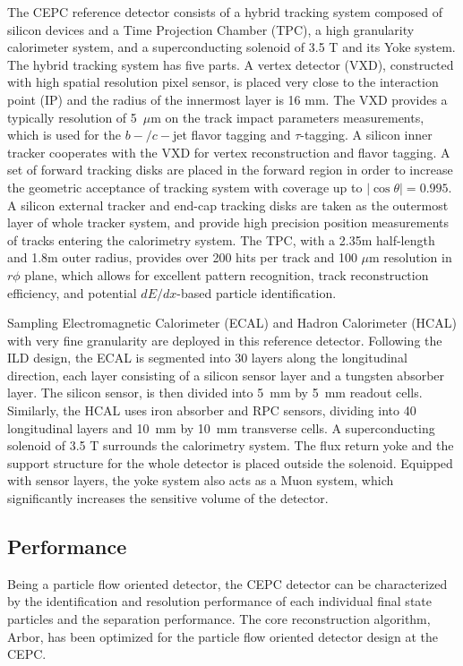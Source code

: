 \documentclass[a4paper,10pt,twoside]{cpc-hepnp}
\begin{document}
\begin{multicols}{2}
The CEPC reference detector consists of a hybrid tracking system composed of silicon devices and a Time Projection Chamber (TPC), 
a high granularity calorimeter system, and a superconducting solenoid of 3.5 T and its Yoke system. 
The hybrid tracking system has five parts. A vertex detector (VXD), constructed with high spatial resolution pixel sensor,
is placed very close to the interaction point (IP) and the radius of the innermost layer is 16 mm.
The VXD provides a typically resolution of 5~$\mu$m on the track impact parameters measurements, 
which is used for the $b-/c-$jet flavor tagging and $\tau$-tagging.
A silicon inner tracker cooperates with the VXD for vertex reconstruction and flavor tagging.
A set of forward tracking disks are placed in the forward region
in order to increase the geometric acceptance of tracking system with coverage up to $|\cos\theta| = 0.995$.
A silicon external tracker and end-cap tracking disks are taken as the outermost layer of whole tracker system,
and provide high precision position measurements of tracks entering the calorimetry system.
The TPC, with a 2.35m half-length and 1.8m outer radius, provides over 200 hits per track and 100 $\mu$m resolution in $r\phi$ plane,
which allows for excellent pattern recognition, track reconstruction efficiency, and potential $dE/dx$-based particle identification.

Sampling Electromagnetic Calorimeter (ECAL) and Hadron Calorimeter (HCAL) with very fine granularity are deployed in this reference detector.
Following the ILD design, the ECAL is segmented into 30 layers along the longitudinal direction, each layer consisting of a silicon sensor layer and a tungsten absorber layer. 
The silicon sensor, is then divided into 5~mm by 5~mm readout cells. 
Similarly, the HCAL uses iron absorber and RPC sensors, dividing into 40 longitudinal layers and 10~mm by 10~mm transverse cells. 
A superconducting solenoid of 3.5 T surrounds the calorimetry system.
The flux return yoke and the support structure for the whole detector is placed outside the solenoid. 
Equipped with sensor layers, the yoke system also acts as a Muon system, which significantly increases the sensitive volume of the detector. 

\subsection{Performance}

Being a particle flow oriented detector, the CEPC detector can be characterized by the identification and resolution performance of each individual final state particles and the separation performance. 
The core reconstruction algorithm, Arbor\cite{ref:arbor}, has been optimized for the particle flow oriented detector design at the CEPC. 


\end{multicols}
\end{document}
